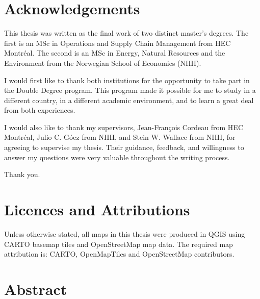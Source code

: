 \documentclass[12pt]{article}
\begin{document}
\onehalfspacing

\section*{Acknowledgements}

This thesis was written as the final work of two distinct master's degrees. The first is an MSc in Operations and Supply Chain Management from HEC Montréal. The second is an MSc in Energy, Natural Resources and the Environment from the Norwegian School of Economics (NHH).

I would first like to thank both institutions for the opportunity to take part in the Double Degree program. This program made it possible for me to study in a different country, in a different academic environment, and to learn a great deal from both experiences.

I would also like to thank my supervisors, Jean-François Cordeau from HEC Montréal, Julio C. Góez from NHH, and Stein W. Wallace from NHH, for agreeing to supervise my thesis. Their guidance, feedback, and willingness to answer my questions were very valuable throughout the writing process.

Thank you.

\section*{Licences and Attributions}

Unless otherwise stated, all maps in this thesis were produced in QGIS using CARTO basemap tiles and OpenStreetMap map data. The required map attribution is: \textcopyright{} CARTO, \textcopyright{} OpenMapTiles and \textcopyright{} OpenStreetMap contributors.

\section*{Abstract}
\end{document}
